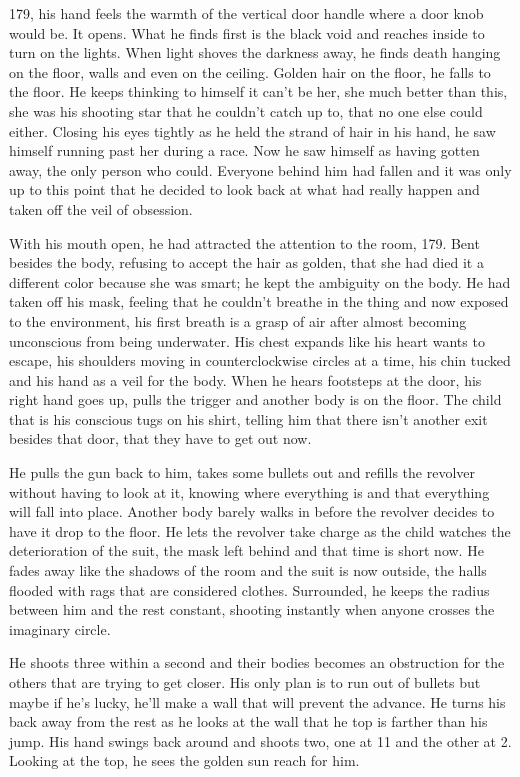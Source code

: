 \begin{Document}
        179, his hand feels the warmth of the vertical door handle where a door knob would be. It opens. What he finds first is the black void and reaches inside
    to turn on the lights. When light shoves the darkness away, he finds death hanging on the floor, walls and even on the ceiling. Golden hair on the floor,
    he falls to the floor. He keeps thinking to himself it can't be her, she much better than this, she was his shooting star that he couldn't catch up to, that
    no one else could either. Closing his eyes tightly as he held the strand of hair in his hand, he saw himself running past her during a race. Now he saw himself
    as having gotten away, the only person who could. Everyone behind him had fallen and it was only up to this point that he decided to look back at what had
    really happen and taken off the veil of obsession.

        With his mouth open, he had attracted the attention to the room, 179. Bent besides the body, refusing to accept the hair as golden, that she had died it
    a different color because she was smart; he kept the ambiguity on the body. He had taken off his mask, feeling that he couldn't breathe in the thing and
    now exposed to the environment, his first breath is a grasp of air after almost becoming unconscious from being underwater. His chest expands like his heart
    wants to escape, his shoulders moving in counterclockwise circles at a time, his chin tucked and his hand as a veil for the body. When he hears footsteps at 
    the door, his right hand goes up, pulls the trigger and another body is on the floor. The child that is his conscious tugs on his shirt, telling him that
    there isn't another exit besides that door, that they have to get out now.

        He pulls the gun back to him, takes some bullets out and refills the revolver without having to look at it, knowing where everything is and that 
    everything will fall into place. Another body barely walks in before the revolver decides to have it drop to the floor. He lets the revolver take charge as
    the child watches the deterioration of the suit, the mask left behind and that time is short now. He fades away like the shadows of the room and the suit
    is now outside, the halls flooded with rags that are considered clothes. Surrounded, he keeps the radius between him and the rest constant, shooting instantly
    when anyone crosses the imaginary circle. 

        He shoots three within a second and their bodies becomes an obstruction for the others that are trying to get closer. His only plan is to run out of 
    bullets but maybe if he's lucky, he'll make a wall that will prevent the advance. He turns his back away from the rest as he looks at the wall that he
    top is farther than his jump. His hand swings back around and shoots two, one at 11 and the other at 2. Looking at the top, he sees the golden sun reach
    for him.


\end{Document}
